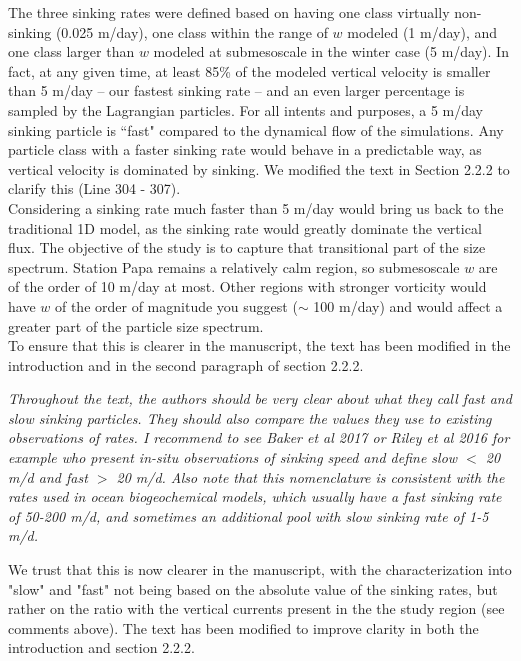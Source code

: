 \documentclass[12pt,letter]{article}
\begin{document}
{\color{blue}
	The three sinking rates were defined based on having one class virtually non-sinking (0.025 m/day), one class within the range of $w$ modeled (1 m/day), and one class larger than $w$ modeled at submesoscale in the winter case (5 m/day). In fact, at any given time, at least 85\% of the modeled vertical velocity is smaller than 5 m/day -- our fastest sinking rate -- and an even larger percentage is sampled by the Lagrangian particles. For all intents and purposes, a 5 m/day sinking particle is ``fast" compared to the dynamical flow of the simulations. Any particle class with a faster sinking rate would behave in a predictable way, as vertical velocity is dominated by sinking. We modified the text in Section 2.2.2 to clarify this (Line 304 - 307).\\


	Considering a sinking rate much faster than 5 m/day would bring us back to the traditional 1D model, as the sinking rate would greatly dominate the vertical flux. The objective of the study is to capture that transitional part of the size spectrum. Station Papa remains a relatively calm region, so submesoscale $w$ are of the order of 10 m/day at most. Other regions with stronger vorticity would have $w$ of the order of magnitude you suggest ($\sim$ 100 m/day) and would affect a greater part of the particle size spectrum.\\

To ensure that this is clearer in the manuscript, the text has been modified in the introduction and in the second paragraph of section 2.2.2.\\}

\textit{Throughout the text, the authors should be very clear about what they call fast and slow sinking particles. They should also compare the values they use to existing observations of rates. I recommend to see Baker et al 2017 or Riley et al 2016 for example who present in-situ observations of sinking speed and define slow $<$ 20 m/d and fast $>$ 20 m/d. Also note that this nomenclature is consistent with the rates used in ocean biogeochemical models, which usually have a fast sinking rate of 50-200 m/d, and sometimes an additional pool with slow sinking rate of 1-5 m/d.}

{\color{blue}
	We trust that this is now clearer in the manuscript, with the characterization into "slow" and "fast" not being based on the absolute value of the sinking rates, but rather on the ratio with the vertical currents present in the the study region (see comments above). The text has been modified to improve clarity in both the introduction and section 2.2.2.\\}
	
\end{document}
